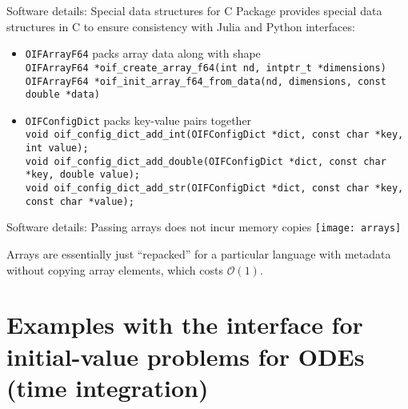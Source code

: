 \documentclass[
  10pt,
  aspectratio=169,
  english,
]{beamer}
\begin{document}
\begin{frame}{Software details: Special data structures for C}
  \small Package provides special data structures in C to ensure consistency
  with Julia and Python interfaces:
  \begin{itemize}
    \item \texttt{OIFArrayF64} packs array data along with shape\\
          \texttt{OIFArrayF64 *oif\_create\_array\_f64(int nd, intptr\_t *dimensions)}\\
          \texttt{OIFArrayF64 *oif\_init\_array\_f64\_from\_data(nd, dimensions, const double *data)
}
      \item<2-> \texttt{OIFConfigDict} packs key-value pairs together\\
          \texttt{void oif\_config\_dict\_add\_int(OIFConfigDict *dict, const char *key, int value);}\\
          \texttt{void oif\_config\_dict\_add\_double(OIFConfigDict *dict, const char *key, double value);}\\
          \texttt{void oif\_config\_dict\_add\_str(OIFConfigDict *dict, const char *key, const char *value);}
  \end{itemize}
\end{frame}

\begin{frame}{Software details: Passing arrays does not incur memory copies}
  \centering
  \texttt{[image: arrays]}

  Arrays are essentially just ``repacked'' for a particular language
  with metadata without copying array elements, which costs $\mathcal O(1)$.
\end{frame}

\section{Examples with the interface for initial-value problems for ODEs (time integration)}
\end{document}
